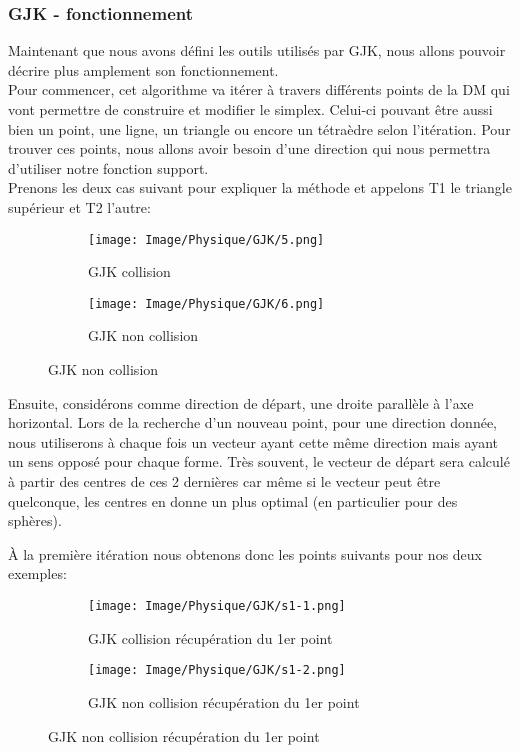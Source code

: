 \subsubsection{GJK - fonctionnement}
Maintenant que nous avons défini les outils utilisés par GJK, nous allons pouvoir décrire plus amplement son fonctionnement.\\

Pour commencer, cet algorithme va itérer à travers différents points de la DM qui vont permettre de construire et modifier le simplex. Celui-ci pouvant être aussi bien un point, une ligne, un triangle ou encore un tétraèdre selon l'itération. Pour trouver ces points, nous allons avoir besoin d'une direction qui nous permettra d'utiliser notre fonction support.\\

\noindent Prenons les deux cas suivant pour expliquer la méthode et appelons T1 le triangle supérieur et T2 l'autre:
\begin{figure}[h!]
	\begin{subfigure}{0.4\linewidth}
		\texttt{[image: Image/Physique/GJK/5.png]}
		\caption{GJK collision}
		\label{fig:GJK collision}
	\end{subfigure}
	\hfill
	\begin{subfigure}{0.4\linewidth}
		\texttt{[image: Image/Physique/GJK/6.png]}
		\caption{GJK non collision}
		\label{fig:GJK non collision}
	\end{subfigure}
\end{figure}

\noindent Ensuite, considérons comme direction de départ, une droite parallèle à l'axe horizontal. Lors de la recherche d'un nouveau point, pour une direction donnée, nous utiliserons à chaque fois un vecteur ayant cette même direction mais ayant un sens opposé pour chaque forme. Très souvent, le vecteur de départ sera calculé à partir des centres de ces 2 dernières car même si le vecteur peut être quelconque, les centres en donne un plus optimal (en particulier pour des sphères).
\pagebreak

\noindent À la première itération nous obtenons donc les points suivants pour nos deux exemples:
\begin{figure}[h!]
	\begin{subfigure}{0.4\linewidth}
		\texttt{[image: Image/Physique/GJK/s1-1.png]}
		\caption{GJK collision récupération du 1er point}
		\label{fig:GJK collision récupération du 1er point}
	\end{subfigure}
	\hfill
	\begin{subfigure}{0.4\linewidth}
		\texttt{[image: Image/Physique/GJK/s1-2.png]}
		\caption{GJK non collision récupération du 1er point}
		\label{fig:GJK non collision récupération du 1er point}
	\end{subfigure}
\end{figure}

